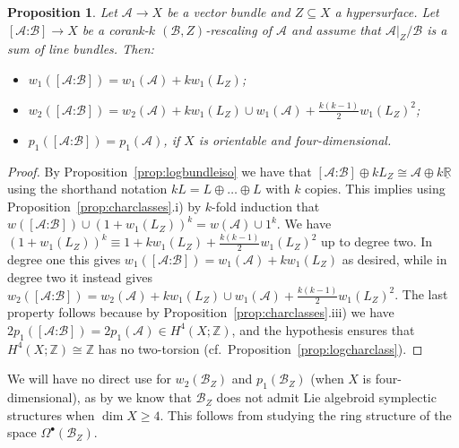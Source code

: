 \documentclass[10pt,a4paper]{amsart}
\numberwithin{equation}{section}
\newtheorem{Proposition}[Theorem]{Proposition}
 { \theoremstyle{definition}
\newtheorem{Definition}[Theorem]{Definition}
\newtheorem{Example}[Theorem]{Example}
\newtheorem{Remark}[Theorem]{Remark} }
\begin{document}
\begin{Proposition} Let $\mathcal{A} \to X$ be a vector bundle and $Z \subseteq X$ a hypersurface. Let $[\mathcal{A}\text{:}\mathcal{B}] \to X$ be a corank-$k$ $(\mathcal{B},Z)$-rescaling of $\mathcal{A}$ and assume that $\mathcal{A}|_Z/\mathcal{B}$ is a sum of line bundles. Then:
	\begin{itemize}\itemsep=0pt
	\item $w_1([\mathcal{A}\text{:}\mathcal{B}]) = w_1(\mathcal{A}) + k w_1(L_Z)$;
	\item $w_2([\mathcal{A}\text{:}\mathcal{B}]) = w_2(\mathcal{A}) + k w_1(L_Z) \cup w_1(\mathcal{A}) + \frac{k(k-1)}2 w_1(L_Z)^2$;
	\item $p_1([\mathcal{A}\text{:}\mathcal{B}]) = p_1(\mathcal{A})$, if $X$ is orientable and four-dimensional.
	\end{itemize}
\end{Proposition}
%
\begin{proof} By Proposition~\ref{prop:logbundleiso} we have that $[\mathcal{A}\text{:}\mathcal{B}] \oplus k L_Z \cong \mathcal{A} \oplus k \underline{\mathbb{R}}$ using the shorthand notation $k L = L \oplus \dots \oplus L$ with $k$ copies. This implies using Proposition~\ref{prop:charclasses}.i) by $k$-fold induction that $w([\mathcal{A}\text{:}\mathcal{B}]) \cup (1 + w_1(L_Z))^k = w(\mathcal{A}) \cup 1^k$. We have $(1 + w_1(L_Z))^k \equiv 1 + k w_1(L_Z) + \frac{k(k-1)}2 w_1(L_Z)^2$ up to degree two. In degree one this gives $w_1([\mathcal{A}\text{:}\mathcal{B}]) = w_1(\mathcal{A}) + k w_1(L_Z)$ as desired, while in degree two it instead gives $w_2([\mathcal{A}\text{:}\mathcal{B}]) = w_2(\mathcal{A}) + k w_1(L_Z) \cup w_1(\mathcal{A}) + \frac{k(k-1)}2 w_1(L_Z)^2$. The last property follows because by Proposition~\ref{prop:charclasses}.iii) we have $2p_1([\mathcal{A}\text{:}\mathcal{B}]) = 2p_1(\mathcal{A}) \in H^4(X;\mathbb{Z})$, and the hypothesis ensures that $H^4(X;\mathbb{Z}) \cong \mathbb{Z}$ has no two-torsion (cf.\ Proposition~\ref{prop:logcharclass}).
\end{proof}

\begin{Remark}\label{rem:zeronosymp} We will have no direct use for $w_2(\mathcal{B}_Z)$ and $p_1(\mathcal{B}_Z)$ (when $X$ is four-dimensional), as by \cite[Proposition 2.21]{Lanius16} we know that $\mathcal{B}_Z$ does not admit Lie algebroid symplectic structures when $\dim X \geq 4$. This follows from studying the ring structure of the space $\Omega^\bullet(\mathcal{B}_Z)$.
\end{Remark}
\end{document}
